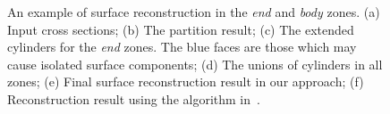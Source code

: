 \begin{figure} [htbp]
{\begin{minipage}[b]{0.3\textwidth}
    \end{minipage}}
  \caption{An example of surface reconstruction in the \textit{end} and \textit{body} zones. (a) Input cross sections; (b) The partition result; (c) The extended cylinders for the \textit{end} zones.  The blue faces are those which may cause isolated surface components; (d) The unions of cylinders in all zones; (e) Final surface reconstruction result in our approach; (f) Reconstruction result using the algorithm in~\cite{LBDLJ08}.}
  \label{fig:partition} %
\end{figure}

